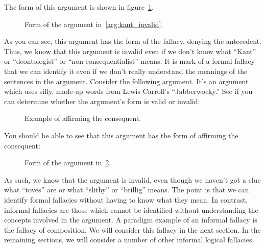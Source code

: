 The form of this argument is shown in figure~\ref{arg:kant_invalid_form}.
\begin{figure}[!ht]
\begin{kormanize}
\end{kormanize}
\label{arg:kant_invalid_form}
\caption{Form of the argument in~\ref{arg:kant_invalid}.}
\end{figure}

As you can see, this argument has the form of the fallacy, denying the antecedent. Thus, we know that this argument is invalid even if we don't know what ``Kant'' or ``deontologist'' or ``non-consequentialist'' means. It is mark of a formal fallacy that we can identify it even if we don't really understand the meanings of the sentences in the argument. Consider the following argument. It's an argument which uses silly, made-up words from Lewis Carroll's ``Jabberwocky.'' See if you can determine whether the argument's form is valid or invalid:

\begin{figure}[!ht]
\begin{kormanize}
\end{kormanize}
\caption{Example of affirming the consequent.}
\label{arg:carroll_invalid}
\end{figure}

You should be able to see that this argument has the form of affirming the consequent:
\begin{figure}[!ht]
\begin{kormanize}
\end{kormanize}
\label{arg:carroll_invalid_form}
\caption{Form of the argument in~\ref{arg:carroll_invalid}.}
\end{figure}

As such, we know that the argument is invalid, even though we haven't got a clue what ``toves'' are or what ``slithy'' or ``brillig'' means. The point is that we can identify formal fallacies without having to know what they mean. In contrast, informal fallacies are those which cannot be identified without understanding the concepts involved in the argument. A paradigm example of an informal fallacy is the fallacy of composition. We will consider this fallacy in the next section. In the remaining sections, we will consider a number of other informal logical fallacies.

